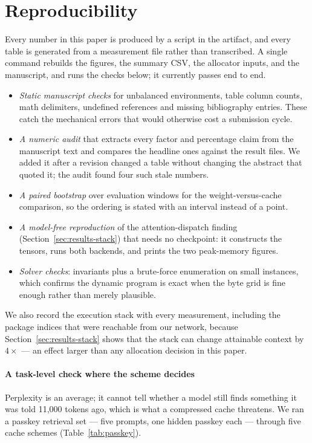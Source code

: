 \documentclass[5p]{elsarticle}
\begin{document}
\section{Reproducibility}
\label{sec:repro}

Every number in this paper is produced by a script in the artifact, and every
table is generated from a measurement file rather than transcribed. A single
command rebuilds the figures, the summary CSV, the allocator inputs, and the
manuscript, and runs the checks below; it currently passes end to end.

\begin{itemize}
\item \emph{Static manuscript checks} for unbalanced environments, table column
      counts, math delimiters, undefined references and missing bibliography
      entries. These catch the mechanical errors that would otherwise cost a
      submission cycle.
\item \emph{A numeric audit} that extracts every factor and percentage claim from
      the manuscript text and compares the headline ones against the result
      files. We added it after a revision changed a table without changing the
      abstract that quoted it; the audit found four such stale numbers.
\item \emph{A paired bootstrap} over evaluation windows for the weight-versus-cache
      comparison, so the ordering is stated with an interval instead of a point.
\item \emph{A model-free reproduction} of the attention-dispatch finding
      (Section~\ref{sec:results-stack}) that needs no checkpoint: it constructs
      the tensors, runs both backends, and prints the two peak-memory figures.
\item \emph{Solver checks}: invariants plus a brute-force enumeration on small
      instances, which confirms the dynamic program is exact when the byte grid
      is fine enough rather than merely plausible.
\end{itemize}

We also record the execution stack with every measurement, including the package
indices that were reachable from our network, because
Section~\ref{sec:results-stack} shows that the stack can change attainable
context by $4\times$ --- an effect larger than any allocation decision in this
paper.

\paragraph*{A task-level check where the scheme decides}
Perplexity is an average; it cannot tell whether a model still finds something it
was told 11{,}000 tokens ago, which is what a compressed cache threatens. We ran a
passkey retrieval set --- five prompts, one hidden passkey each --- through five
cache schemes (Table~\ref{tab:passkey}).
\end{document}
